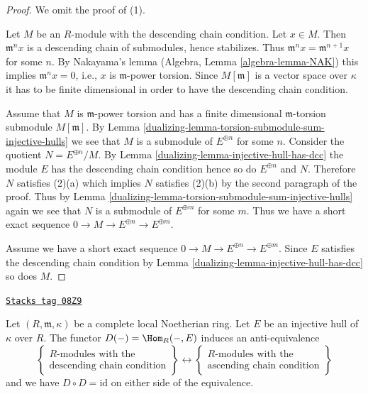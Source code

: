 \begin{proof}

We omit the proof of (1).

\medskip\noindent
Let $M$ be an $R$-module with the descending chain condition. Let $x \in M$.
Then $\mathfrak m^n x$ is a descending chain of submodules, hence stabilizes.
Thus $\mathfrak m^nx = \mathfrak m^{n + 1}x$ for some $n$. By Nakayama's lemma
(Algebra, Lemma \ref{algebra-lemma-NAK}) this implies $\mathfrak m^n x = 0$,
i.e., $x$ is $\mathfrak m$-power torsion. Since $M[\mathfrak m]$ is a vector
space over $\kappa$ it has to be finite dimensional in order to have the
descending chain condition.

\medskip\noindent
Assume that $M$ is $\mathfrak m$-power torsion and has a finite dimensional
$\mathfrak m$-torsion submodule $M[\mathfrak m]$. By
Lemma \ref{dualizing-lemma-torsion-submodule-sum-injective-hulls}
we see that $M$ is a submodule of $E^{\oplus n}$ for some $n$.
Consider the quotient $N = E^{\oplus n}/M$. By
Lemma \ref{dualizing-lemma-injective-hull-has-dcc} the module $E$ has the
descending chain condition hence so do $E^{\oplus n}$ and $N$.
Therefore $N$ satisfies (2)(a) which implies $N$ satisfies
(2)(b) by the second paragraph of the proof. Thus by
Lemma \ref{dualizing-lemma-torsion-submodule-sum-injective-hulls}
again we see that $N$ is a submodule of $E^{\oplus m}$ for some $m$.
Thus we have a short exact sequence
$0 \to M \to E^{\oplus n} \to E^{\oplus m}$.

\medskip\noindent
Assume we have a short exact sequence
$0 \to M \to E^{\oplus n} \to E^{\oplus m}$.
Since $E$ satisfies the descending chain condition by
Lemma \ref{dualizing-lemma-injective-hull-has-dcc}
so does $M$.
\end{proof}

\begin{proposition}

\label{dualizing-proposition-matlis}
\href{https://stacks.math.columbia.edu/tag/08Z9}{\texttt{Stacks tag 08Z9}}

Let $(R, \mathfrak m, \kappa)$ be a complete local Noetherian ring.
Let $E$ be an injective hull of $\kappa$ over $R$. The functor
$D(-) = \Hom_R(-, E)$ induces an anti-equivalence
$$
\left\{
\begin{matrix}
R\text{-modules with the} \\
\text{descending chain condition}
\end{matrix}
\right\}
\longleftrightarrow
\left\{
\begin{matrix}
R\text{-modules with the} \\
\text{ascending chain condition}
\end{matrix}
\right\}
$$
and we have $D \circ D = \text{id}$ on either side of the equivalence.
\end{proposition}

